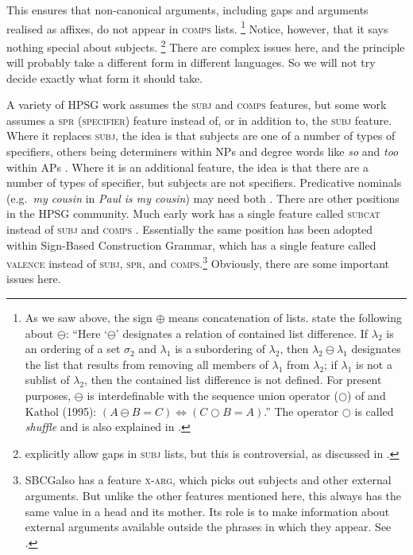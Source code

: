 \documentclass[output=paper,biblatex,babelshorthands,newtxmath,draftmode,colorlinks,citecolor=brown]{langscibook}
\begin{document}
\noindent
This ensures that non-canonical arguments, including gaps and arguments realised as affixes, do not appear in \textsc{comps} lists.%
%
\footnote{\label{fn-shuffle}As we saw above, the sign $\oplus$ means concatenation of lists. \citet[]{GSag2000a-u} state the
  following about $\ominus$: ``Here `$\ominus$' designates a relation of contained list difference. If
$\lambda_2$ is an ordering of a set $\sigma_2$ and $\lambda_1$ is a subordering of $\lambda_2$, then
$\lambda_2 \ominus \lambda_1$ designates the list that results from removing all members of
$\lambda_1$ from $\lambda_2$; if $\lambda_1$ is not a sublist of $\lambda_2$, then the contained
list difference is not defined. For present purposes, $\ominus$ is interdefinable with the sequence
union operator ($\bigcirc$\is{$\bigcirc$}) of
\citet{Reape94a} and Kathol (1995): $(A \ominus B = C) \Leftrightarrow (C \bigcirc B = A)$.'' The
operator $\bigcirc$ is called \emph{shuffle} and is also explained in \crossrefchapterw[\page \pageref{rel-shuffle}]{order}.}
%
Notice, however, that it says nothing special about subjects.%
%
\footnote{\citet[177--183]{GSag2000a-u} explicitly allow gaps in \textsc{subj} lists, but this is
  controversial, as discussed in \crossrefchapterw[\page
  \pageref{udc:page-subject-gaps-start}--\pageref{udc:page-subject-gaps-end}]{udc}.}
%
There are complex issues here, and the principle will probably take a different form in different languages. So we will not try decide exactly what form it should take.

A variety of HPSG work assumes the \textsc{subj} and \textsc{comps} features, but some work assumes
a \textsc{spr (specifier)} feature instead of, or in addition to, the \textsc{subj} feature. Where it
replaces \textsc{subj}, the idea is that subjects are one of a number of types of specifiers, others
being determiners within NPs and degree words like \emph{so} and \emph{too} within APs
\citep[]{ps2}. Where it is an additional feature, the idea is that there are a number of
types of specifier, but subjects are not specifiers. Predicative nominals (e.g.\ \emph{my cousin} in
\emph{Paul is my cousin}) may need both
\parencites[Section~9.4.1]{ps2}[409]{GSag2000a-u}{AG2003b-u}. There are other positions in the HPSG 
community. Much early work has a single feature called \textsc{subcat}
instead of \textsc{subj} and \textsc{comps} \citep{ps}. Essentially the same position has been
adopted within Sign-Based Construction Grammar, which has a single feature called \textsc{valence}
instead of \textsc{subj}, \textsc{spr}, and \textsc{comps}.\footnote{%
  SBCG\indexsbcg also has a feature \textsc{x-arg}, which picks out subjects and other external arguments. But
  unlike the other features mentioned here, this always has the same value in a head and its
  mother. Its role is to make information about external arguments available outside the phrases in
  which they appear.  See \citet[84, 149--151]{Sag2007a,Sag2012a}.} 
%
Obviously, there are some important issues here.
\end{document}
